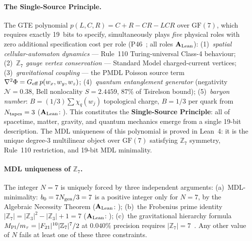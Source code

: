 \paragraph{The Single-Source Principle.}
The GTE polynomial $p(L,C,R) = C + R - CR - LCR$ over $\mathrm{GF}(7)$, which
requires exactly 19~bits to specify, simultaneously plays \emph{five} physical
roles with zero additional specification cost per role
(P46~\cite{SpivackGTEPolynomialUFT}; all roles $\mathbf{A}_{\rm Lean}$):
(1)~\emph{spatial cellular-automaton dynamics} --- Rule~110 Turing-universal
Class-4 behaviour;
(2)~\emph{$\mathbb{Z}_7$ gauge vertex conservation} --- Standard Model
charged-current vertices;
(3)~\emph{gravitational coupling} --- the PMDL Poisson source term
$\nabla^2\Phi = G_{\rm eff}\,p(w_x,w_y,w_z)$;
(4)~\emph{quantum entanglement generator} (negativity $\mathcal{N} = 0.38$, Bell nonlocality $S = 2.4459$, $87\%$ of Tsirelson bound);
(5)~\emph{baryon number}: $B = (1/3)\sum \chi_q(w_j)$ topological charge, $B = 1/3$ per quark from $N_{\rm tapes} = 3$
($\mathbf{A}_{\rm Lean}$: ).
This constitutes the \textbf{Single-Source Principle}: all of spacetime, matter,
gravity, and quantum mechanics emerge from a single 19-bit description.
The MDL uniqueness of this polynomial is proved in Lean~4: it is the unique
degree-3 multilinear object over $\mathrm{GF}(7)$ satisfying $\mathbb{Z}_7$
symmetry, Rule~110 restriction, and 19-bit MDL minimality.

\paragraph{MDL uniqueness of $\mathbb{Z}_7$.}
The integer $N = 7$ is uniquely forced by three independent arguments:
(a)~MDL-minimality: $b_0 = 7N_{\rm gen}/3 = 7$ is a positive integer only for
$N=7$, by the Algebraic Necessity Theorem
($\mathbf{A}_{\rm Lean}$: );
(b)~the Frobenius prime identity $|\mathbb{Z}_7| = |\mathbb{Z}_3|^2 - |\mathbb{Z}_3|
+ 1 = 7$ ($\mathbf{A}_{\rm Lean}$: );
(c)~the gravitational hierarchy formula
$M_{\rm Pl}/m_\tau = |F_{21}|^{10}|\mathbb{Z}_7|^7/2$ at $0.040\%$ precision
requires $|\mathbb{Z}_7| = 7$~\cite{SpivackCompleteness}.
Any other value of $N$ fails at least one of these three constraints.

